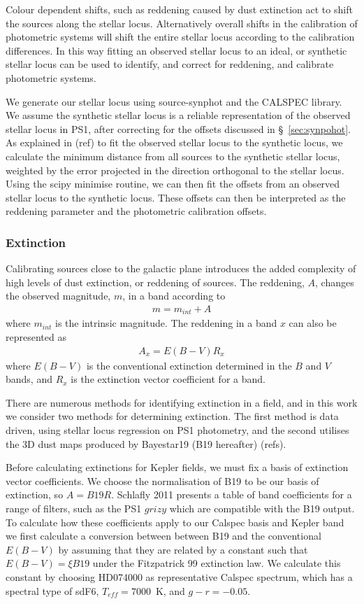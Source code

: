 \documentclass{aastex63}
\begin{document}
Colour dependent shifts, such as reddening caused by dust extinction act to shift the sources along the stellar locus. Alternatively overall shifts in the calibration of photometric systems will shift the entire stellar locus according to the calibration differences. In this way fitting an observed stellar locus to an ideal, or synthetic stellar locus can be used to identify, and correct for reddening, and calibrate photometric systems. 

We generate our stellar locus using source-synphot and the CALSPEC library. We assume the synthetic stellar locus is a reliable representation of the observed stellar locus in PS1, after correcting for the offsets discussed in \S~\ref{sec:synpohot}. As explained in (ref) to fit the observed stellar locus to the synthetic locus, we calculate the minimum distance from all sources to the synthetic stellar locus, weighted by the error projected in the direction orthogonal to the stellar locus. Using the scipy minimise routine, we can then fit the offsets from an observed stellar locus to the synthetic locus. These offsets can then be interpreted as the reddening parameter and the photometric calibration offsets.


\subsubsection{Extinction}
Calibrating sources close to the galactic plane introduces the added complexity of high levels of dust extinction, or reddening of sources. The reddening, $A$, changes the observed magnitude, $m$, in a band according to
\begin{eqnarray}
m = m_{int} + A
\end{eqnarray}
where $m_{int}$ is the intrinsic magnitude. The reddening in a band $x$ can also be represented as
\begin{eqnarray}
A_x = E(B-V)R_x
\end{eqnarray}
where $E(B-V)$ is the conventional extinction determined in the $B$ and $V$ bands, and $R_x$ is the extinction vector coefficient for a band.

There are numerous methods for identifying extinction in a field, and in this work we consider two methods for determining extinction. The first method is data driven, using stellar locus regression on PS1 photometry, and the second utilises the 3D dust maps produced by Bayestar19 (B19 hereafter) (refs). 

Before calculating extinctions for Kepler fields, we must fix a basis of extinction vector coefficients. We choose the normalisation of B19 to be our basis of extinction, so $A=B19R$. Schlafly 2011 presents a table of band coefficients for a range of filters, such as the PS1 $grizy$ which are compatible with the B19 output. To calculate how these coefficients apply to our Calspec basis and Kepler band we first calculate a conversion between between B19 and the conventional $E(B-V)$ by assuming that they are related by a constant such that $E(B-V)=\xi B19$ under the Fitzpatrick 99 extinction law. We calculate this constant by choosing HD074000 as representative Calspec spectrum, which has a spectral type of sdF6, $T_{eff}=7000$~K, and $g-r=-0.05$. 
\end{document}
